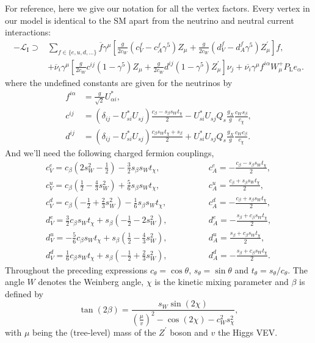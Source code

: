 \documentclass[11pt, a4paper]{article}
\begin{document}
For reference, here we give our notation for all the vertex factors. Every
vertex in our model is identical to the SM apart from the neutrino and neutral
current interactions:
%
\begin{align*}  
%
-\mathcal{L}_\text{I} \supset &\sum_{f\in\{e,u,d,\dots\}}
\overline{f}\gamma^\mu \left[
\frac{g}{2c_W}\left(c^f_V-c^f_A\gamma^5\right)Z_\mu  +
\frac{g}{2c_W}\left(d^f_V-d^f_A\gamma^5\right)Z^\prime_\mu \right]f, \\
%
&+\overline{\nu}_i\gamma^\mu \left[
\frac{g}{2c_W}c^{ij}\left(1-\gamma^5\right)Z_\mu  +
\frac{g}{2c_W}d^{ij}\left(1-\gamma^5\right)Z^\prime_\mu \right] \nu_j +
\overline{\nu_i}\gamma^\mu f^{i\alpha}W^+_\mu P_\text{L} e_\alpha. 
%
\end{align*}
%
where the undefined constants are given for the neutrinos by
%
\begin{align*}
%
f^{i\alpha} &= \frac{g}{\sqrt{2}}U^*_{\alpha i}, \\
%
c^{ij} &= \left(\delta_{ij} - U^*_{si}U_{sj}\right)\frac{c_\beta - s_\beta s_W
t_\chi}{2} - U^*_{si}U_{sj}Q_s \frac{g_X}{g}\frac{c_W s_\beta}{c_\chi}, \\
d^{ij} &= \left(\delta_{ij} - U^*_{si}U_{sj}\right)\frac{c_\beta s_W t_\chi +
s_\beta}{2} + U^*_{si}U_{sj}Q_s \frac{g_X}{g}\frac{c_W c_\beta}{c_\chi}.
\end{align*}
%
And we'll need the following charged fermion couplings,
%
\begin{align*} c^e_V = c_\beta \left(2s_W^2-\frac{1}{2}\right) -
\frac{3}{2}s_\beta s_W t_\chi, \qquad&\qquad c^e_A = -\frac{c_\beta - s_\beta
s_W t_\chi}{2}, \\
%
c^u_V = c_\beta \left(\frac{1}{2}-\frac{4}{3}s_W^2\right) + \frac{5}{6}s_\beta
s_W t_\chi,\qquad&\qquad c^u_A = \frac{c_\beta + s_\beta s_W t_\chi}{2}, \\
%
c^d_V = c_\beta \left(-\frac{1}{2}+\frac{2}{3}s_W^2\right) - \frac{1}{6}s_\beta
s_W t_\chi, \qquad&\qquad c^d_A = -\frac{c_\beta + s_\beta s_W t_\chi}{2}, \\
%
d^e_V = \frac{3}{2}c_\beta s_Wt_\chi + s_\beta\left(-\frac{1}{2} -
2s^2_W\right), \qquad&\qquad d^e_A = -\frac{s_\beta + c_\beta s_W t_\chi}{2},
\\
%
d^u_V = -\frac{5}{6}c_\beta s_Wt_\chi + s_\beta\left(\frac{1}{2} -
\frac{4}{3}s^2_W\right),\qquad&\qquad d^u_A = \frac{s_\beta + c_\beta s_W
t_\chi}{2}, \\
%
d^d_V = \frac{1}{6}c_\beta s_Wt_\chi + s_\beta\left(-\frac{1}{2} +
\frac{2}{3}s^2_W\right),\qquad & \qquad d^d_A = -\frac{s_\beta + c_\beta s_W
t_\chi}{2}.
%
\end{align*}
%
Throughout the preceding expressions $c_\theta = \cos\theta$, $s_\theta =
\sin\theta$ and $t_\theta = s_\theta/c_\theta$. The angle $W$ denotes the
Weinberg angle, $\chi$ is the kinetic mixing parameter and $\beta$ is defined
by
%
\[   \tan(2\beta) = \frac{s_W \sin(2\chi)}{\left(\frac{\mu}{v}\right)^2 -
\cos(2\chi) - c_W^2 s_\chi^2}, \]
%
with $\mu$ being the (tree-level) mass of the $Z^\prime$ boson and $v$ the
Higgs VEV.



{}
\end{document}
